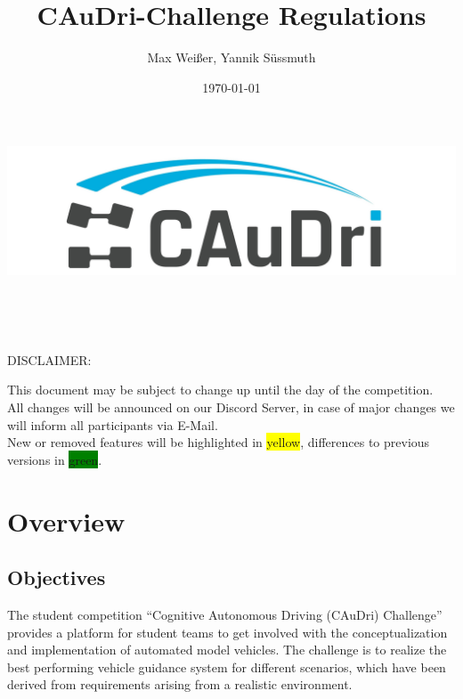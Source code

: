 \documentclass[a4paper]{report}
\title{CAuDri-Challenge Regulations \the\year{}}
\author{Max Weißer, Yannik Süssmuth}
\date{\today}
\begin{document}
\begin{titlepage}
	\makeatletter
	\begin{center}
		\vspace*{3cm}

		\includegraphics[width=\textwidth]{graphics/caudri_logo_no_border.jpg}\\
		\vspace{1cm}

		\Huge\bfseries\@title\\
		\vspace{\baselineskip}

		\Large\@date\\
		\vspace{8cm}

		\large DISCLAIMER:\\

		{\raggedright This document may be subject to change up until the day of the competition.\\
		All changes will be announced on our Discord Server, in case of major changes we will inform all participants via E-Mail.\\
		New or removed features will be highlighted in \colorbox{yellow}{yellow}, differences to previous versions in \colorbox{green}{green}.\\}

	\end{center}
	\makeatother
\end{titlepage}

\tableofcontents

\chapter{Overview}

\section{Objectives}

The student competition “Cognitive Autonomous Driving (CAuDri) Challenge”
provides a platform for student teams to get involved with the
conceptualization and implementation of automated model vehicles. The challenge
is to realize the best performing vehicle guidance system for different
scenarios, which have been derived from requirements arising from a realistic
environment.
\end{document}
